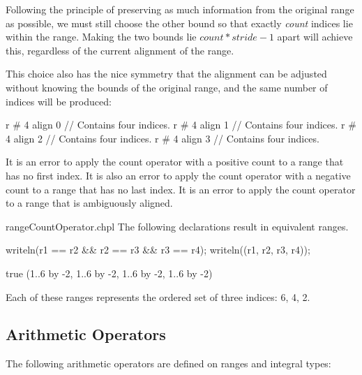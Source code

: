 \begin{rationale}
Following the principle of preserving as much information from the original
range as possible, we must still choose the other bound so that
exactly \emph{count} indices lie within the range.  Making the two bounds lie
$count * stride - 1$ apart will achieve this, regardless of the current
alignment of the range.

This choice also has the nice symmetry that the alignment can be adjusted
without knowing the bounds of the original range, and the same number of indices
will be produced:
\begin{chapel}
r # 4 align 0   // Contains four indices.
r # 4 align 1   // Contains four indices.
r # 4 align 2   // Contains four indices.
r # 4 align 3   // Contains four indices.
\end{chapel}
\end{rationale}

It is an error to apply the count operator with a positive count to a range that
has no first index.  It is also an error to apply the count operator
with a negative count to a range that has no last index.
It is an error to apply the count operator to a range that is ambiguously aligned.

\begin{chapelexample}{rangeCountOperator.chpl}
The following declarations result in equivalent ranges.
\begin{chapelpost}
writeln(r1 == r2 \&\& r2 == r3 \&\& r3 == r4);
writeln((r1, r2, r3, r4));
\end{chapelpost}
\begin{chapeloutput}
true
(1..6 by -2, 1..6 by -2, 1..6 by -2, 1..6 by -2)
\end{chapeloutput}
Each of these ranges represents the ordered set of three indices: 6, 4, 2.
\end{chapelexample}

\subsection{Arithmetic Operators}
\label{Range_Arithmetic}

The following arithmetic operators are defined on ranges and integral
types:

